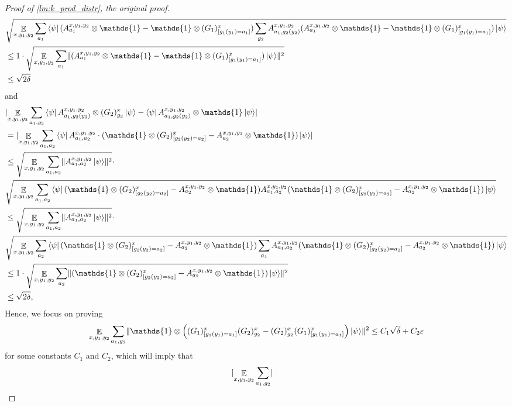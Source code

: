 \documentclass[10pt,a4paper]{article}
\theoremstyle{plain}
\theoremstyle{definition}
\DeclarePairedDelimiter{\norm}{\lVert}{\rVert}
\DeclarePairedDelimiter{\abs}{\lvert}{\rvert}
\newcommand {\bra} [1] {\ensuremath{ \left\langle #1 \right| }}
\newcommand {\ket} [1] {\ensuremath{ \left| #1 \right\rangle }}
\DeclareMathOperator*{\bigE}{\mathbb{E}}
\newcommand {\id} {\ensuremath{\mathds{1}}}
\newcommand{\ep} {\ensuremath{\varepsilon}}
\newcommand{\x}{\otimes}
\newcommand{\1}{\mathbb{1}} %
\begin{document}
\begin{proof}[Proof of \cref{lm:k_prod_distr}, the original proof]
\begin{align*}
		&
		\sqrt{ \bigE_{x,y_1,y_2} \sum_{a_1} \bra{\psi} (A^{x,y_1,y_2}_{a_1} \x\id -\id\x(G_1)^x_{[g_1(y_1) = a_1]}) \sum_{g_2} A^{x,y_1,y_2}_{a_1, g_2(y_2) }
		(A^{x,y_1,y_2}_{a_1} \x\id -\id\x(G_1)^x_{[g_1(y_1) = a_1]})\ket{\psi}}	\\
		&\leq 1 \cdot \sqrt{ \bigE_{x,y_1,y_2} \sum_{a_1} \norm{(A^{x,y_1,y_2}_{a_1} \x\id -\id\x(G_1)^x_{[g_1(y_1) = a_1]})\ket{\psi}}^2} \\
		&\leq \sqrt{2\delta}
	\end{align*}
	and
	\begin{align*}
		&\abs{\bigE_{x,y_1,y_2} \sum_{a_1, g_2 }\bra{\psi} A^{x,y_1,y_2}_{a_1, g_2(y_2) }  \x 
		 (G_2)^x_{g_2}  \ket{\psi} - \bra{\psi} A^{x,y_1,y_2}_{a_1,g_2(y_2)} \x \id \ket{\psi}} \\
		 &= \abs{ \bigE_{x,y_1,y_2} \sum_{a_1, a_2 } \bra{\psi} A^{x,y_1,y_2}_{a_1, a_2 } \cdot
		 (\id \x (G_2)^x_{[g_2(y_2)=a_2]} - A^{x,y_1,y_2}_{a_2} \x \id) \ket{\psi}} \\
		 &\leq \sqrt{\bigE_{x,y_1,y_2} \sum_{a_1,a_2} \norm{ A^{x,y_1,y_2}_{a_1, a_2 } \ket{\psi}}^2} 
		 \cdot \\
		 & \sqrt{\bigE_{x,y_1,y_2} \sum_{a_1,a_2}\bra{\psi}  (\id \x (G_2)^x_{[g_2(y_2)=a_2]} - A^{x,y_1,y_2}_{a_2} \x \id) 
		 A^{x,y_1,y_2}_{a_1, a_2 } (\id \x (G_2)^x_{[g_2(y_2)=a_2]} - A^{x,y_1,y_2}_{a_2} \x \id) \ket{\psi}} \\
		 & \leq \sqrt{ \bigE_{x,y_1,y_2} \sum_{a_1,a_2} \norm{ A^{x,y_1,y_2}_{a_1, a_2 } \ket{\psi}}^2} \cdot \\
		 & \sqrt{  \bigE_{x,y_1,y_2} \sum_{a_2} \bra{\psi}  (\id \x (G_2)^x_{[g_2(y_2)=a_2]} - A^{x,y_1,y_2}_{a_2} \x \id) 
		 \sum_{a_1} A^{x,y_1,y_2}_{a_1, a_2 } (\id \x (G_2)^x_{[g_2(y_2)=a_2]} - A^{x,y_1,y_2}_{a_2} \x \id) \ket{\psi}} \\
		 & \leq 1 \cdot \sqrt{ \bigE_{x,y_1,y_2} \sum_{a_2} \norm{ (\id \x (G_2)^x_{[g_2(y_2)=a_2]} - A^{x,y_1,y_2}_{a_2} \x \id) \ket{\psi}}^2} \\
		 & \leq \sqrt{2\delta},
	\end{align*}
	Hence, we focus on proving 
	\begin{align}
        \label{eq:g_1g_2}
		\bigE_{x,y_1,y_2} \sum_{a_1, g_2} \norm{ \id \x \left((G_1)^x_{[g_1(y_1) = a_1]}(G_2)^x_{g_2} - (G_2)^x_{g_2}(G_1)^x_{[g_1(y_1) = a_1]}\right) \ket{\psi}}^2 \leq C_1\sqrt{\delta} +C_2 \ep
	\end{align}
	for some constants $C_1$ and $C_2$, which will imply that 
	\begin{align*}
		& \abs{ \bigE_{x,y_1,y_2} \sum_{a_1, g_2} 
}
\end{align*}
\end{proof}
\end{document}
